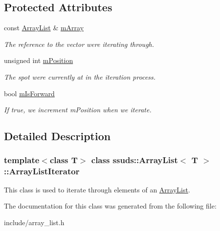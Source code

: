 \subsection*{Protected Attributes}
\begin{DoxyCompactItemize}
\item 
\mbox{\label{classssuds_1_1_array_list_1_1_array_list_iterator_a92c5e4aee1664f55e08ff97e3d1ed46d}} 
const \mbox{\hyperlink{classssuds_1_1_array_list}{Array\+List}} \& \mbox{\hyperlink{classssuds_1_1_array_list_1_1_array_list_iterator_a92c5e4aee1664f55e08ff97e3d1ed46d}{m\+Array}}
\begin{DoxyCompactList}\small\item\em The reference to the vector we\textquotesingle{}re iterating through. \end{DoxyCompactList}\item 
\mbox{\label{classssuds_1_1_array_list_1_1_array_list_iterator_ac7660ea19811cb506c31c721ffc09350}} 
unsigned int \mbox{\hyperlink{classssuds_1_1_array_list_1_1_array_list_iterator_ac7660ea19811cb506c31c721ffc09350}{m\+Position}}
\begin{DoxyCompactList}\small\item\em The spot we\textquotesingle{}re currently at in the iteration process. \end{DoxyCompactList}\item 
\mbox{\label{classssuds_1_1_array_list_1_1_array_list_iterator_ab3d57eb6f2648f947aaf899b03f9a1f2}} 
bool \mbox{\hyperlink{classssuds_1_1_array_list_1_1_array_list_iterator_ab3d57eb6f2648f947aaf899b03f9a1f2}{m\+Is\+Forward}}
\begin{DoxyCompactList}\small\item\em If true, we increment m\+Position when we iterate. \end{DoxyCompactList}\end{DoxyCompactItemize}


\subsection{Detailed Description}
\subsubsection*{template$<$class T$>$\newline
class ssuds\+::\+Array\+List$<$ T $>$\+::\+Array\+List\+Iterator}

This class is used to iterate through elements of an \mbox{\hyperlink{classssuds_1_1_array_list}{Array\+List}}. 

The documentation for this class was generated from the following file\+:\begin{DoxyCompactItemize}
\item 
include/array\+\_\+list.\+h\end{DoxyCompactItemize}

